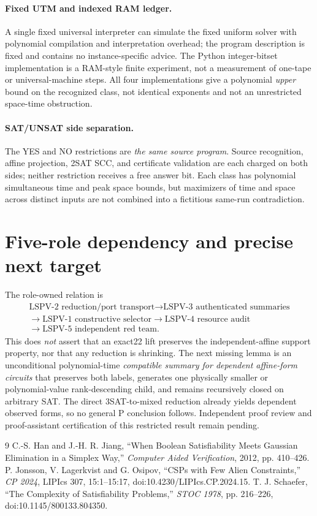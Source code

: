 \documentclass[11pt]{article}
\begin{document}
\paragraph{Fixed UTM and indexed RAM ledger.}
A single fixed universal interpreter can simulate the fixed uniform
solver with polynomial compilation and interpretation overhead; the
program description is fixed and contains no instance-specific advice.
The Python integer-bitset implementation is a RAM-style finite
experiment, not a measurement of one-tape or universal-machine steps.
All four implementations give a polynomial \emph{upper} bound on the
recognized class, not identical exponents and not an unrestricted
space-time obstruction.

\paragraph{SAT/UNSAT side separation.}
The YES and NO restrictions are \emph{the same source program}. Source
recognition, affine projection, 2SAT SCC, and certificate validation
are each charged on both sides; neither restriction receives a free
answer bit. Each class has polynomial simultaneous time and peak space
bounds, but maximizers of time and space across distinct inputs are
not combined into a fictitious same-run contradiction.

\section{Five-role dependency and precise next target}
The role-owned relation is
\[
\begin{gathered}
\text{LSPV-2 reduction/port transport}
\longrightarrow \text{LSPV-3 authenticated summaries}\\
\longrightarrow \text{LSPV-1 constructive selector}
\longrightarrow \text{LSPV-4 resource audit}\\
\longrightarrow \text{LSPV-5 independent red team}.
\end{gathered}
\]
This does \emph{not} assert that an exact22 lift preserves the
independent-affine support property, nor that any reduction is shrinking.
The next missing lemma is an unconditional polynomial-time
\emph{compatible summary for dependent affine-form circuits} that
preserves both labels, generates one physically smaller or
polynomial-value rank-descending child, and remains recursively closed
on arbitrary SAT. The direct 3SAT-to-mixed reduction already yields
dependent observed forms, so no general P conclusion follows.
Independent proof review and proof-assistant certification of this
restricted result remain pending.

\begin{thebibliography}{9}
 C.-S. Han and J.-H. R. Jiang, ``When Boolean Satisfiability Meets Gaussian Elimination in a Simplex Way,'' \emph{Computer Aided Verification}, 2012, pp. 410--426.
 P. Jonsson, V. Lagerkvist and G. Osipov, ``CSPs with Few Alien Constraints,'' \emph{CP 2024}, LIPIcs 307, 15:1--15:17, doi:10.4230/LIPIcs.CP.2024.15.
 T. J. Schaefer, ``The Complexity of Satisfiability Problems,'' \emph{STOC 1978}, pp. 216--226, doi:10.1145/800133.804350.
\end{thebibliography}
\end{document}
